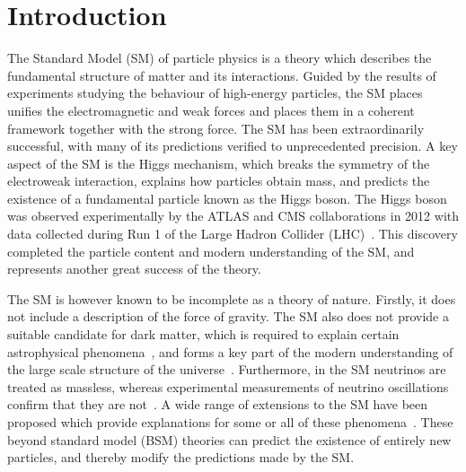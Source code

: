 \chapter{Introduction}
\label{chap:intro}

The Standard Model (SM) of particle physics is a theory which describes
the fundamental structure of matter and its interactions.
Guided by the results of experiments studying the behaviour of high-energy particles, 
the SM places unifies the electromagnetic and weak forces and places them in a coherent framework
together with the strong force.
The SM has been extraordinarily successful, 
with many of its predictions verified to unprecedented precision.
A key aspect of the SM is the Higgs mechanism, 
which breaks the symmetry of the electroweak interaction, explains how particles obtain mass, 
and predicts the existence of a fundamental particle known as the Higgs boson.
The Higgs boson was observed experimentally by the ATLAS and CMS collaborations in 2012
with data collected during Run 1 of the Large Hadron Collider (LHC)~\cite{ATLASdiscovery,CMSdiscovery}.
This discovery completed the particle content and modern understanding of the SM, 
and represents another great success of the theory.

The SM is however known to be incomplete as a theory of nature.
Firstly, it does not include a description of the force of gravity.
The SM also does not provide a suitable candidate for dark matter, 
which is required to explain certain astrophysical phenomena~\cite{BulletCluster},
and forms a key part of the modern understanding 
of the large scale structure of the universe~\cite{Planck}.
Furthermore, in the SM neutrinos are treated as massless, 
whereas experimental measurements of neutrino oscillations confirm that they are not~\cite{NeutrinoOscillation}.
A wide range of extensions to the SM have been proposed 
which provide explanations for some or all of these phenomena~\cite{SUSY}.
These beyond standard model (BSM) theories can predict the existence of entirely new particles, 
and thereby modify the predictions made by the SM.

